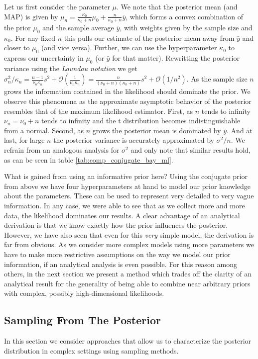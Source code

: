 Let us first consider the parameter $\mu$.
We note that the posterior mean (and MAP) is given by $\mu_n =\frac{\kappa_0}{\kappa_0 + n}\mu_0 + \frac{n}{\kappa_0 + n}\bar{y}$, which forms a convex combination of the prior $\mu_0$ and the sample average $\bar{y}$, with weights given by the sample size and $\kappa_0$.
For any fixed $n$ this pulls our estimate of the posterior mean away from $\bar{y}$ and closer to $\mu_0$ (and vice versa).
Further, we can use the hyperparameter $\kappa_0$ to express our uncertainty in $\mu_0$ (or $\bar{y}$ for that matter).
Rewritting the posterior variance using the \emph{Laundau notation} we get $\sigma_n^2 / \kappa_n = \frac{n-1}{\nu_n \kappa_n} s^2 + \mathcal{O}(\frac{1}{\nu_n\kappa_n}) = \frac{n}{(\nu_0 + n)(\kappa_0 + n)} s^2 + \mathcal{O}(1/n^2)$.
As the sample size $n$ grows the information contained in the likelihood should dominate the prior.
We observe this phenomena as the approximate asymptotic behavior of the posterior resembles that of the maximum likelihood estimator.
First, as $n$ tends to infinity $\nu_n = \nu_0 + n$ tends to infinity and the t distribution becomes indistinguishable from a normal.
Second, as $n$ grows the posterior mean is dominated by $\bar{y}$. And at last, for large $n$ the posterior variance is accurately approximated by $\sigma^2 / n$.
We refrain from an analogous analysis for $\sigma^2$ and only note that similar results hold, as can be seen in table \ref{tab:comp_conjugate_bay_ml}.

What is gained from using an informative prior here?
Using the conjugate prior from above we have four hyperparameters at hand to model our prior knowledge about the parameters.
These can be used to represent very detailed to very vague information.
In any case, we were able to see that as we collect more and more data, the likelihood dominates our results.
A clear advantage of an analytical derivation is that we know exactly how the prior influences the posterior.
However, we have also seen that even for this \emph{very} simple model, the derivation is far from obvious.
As we consider more complex models using more parameters we have to make more restrictive assumptions on the way we model our prior information, if an analytical analysis is even possible.
For this reason among others, in the next section we present a method which trades off the clarity of an analytical result for the generality of being able to combine near arbitrary priors with complex, possibly high-dimensional likelihoods.


\newpage
\subsection{Sampling From The Posterior}
In this section we consider approaches that allow us to characterize the posterior distribution in complex settings using sampling methods.

